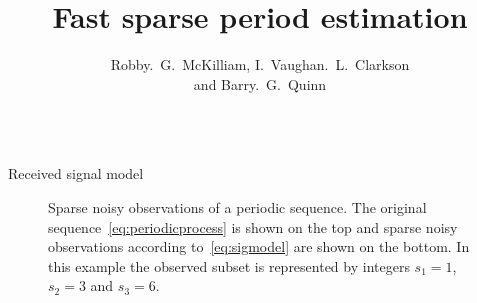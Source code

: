 \documentclass[final,hyperref={pdfpagelabels=false}]{beamer}
\title[]{Fast sparse period estimation}
\author{Robby.~G.~McKilliam, I.~Vaughan.~L.~Clarkson \\ and Barry.~G.~Quinn}
\begin{document}


\begin{columns}[t] %
\begin{column}{.49\textwidth} %

\newcommand{\calC}{{\mathcal C}}
\begin{block}{Received signal model}

{
\def\vertgap{2}
\def\ph{0.4}
\def\T{1.1}
\newcommand{\raxis}{\draw[->] (-0.25,0) -- (8,0) node[above] {$\reals$}; \draw (0,-0.06)-- node[below] {$0$} (0,0.06) }
\newcommand{\pulse}[1]{ \draw[->,>=latex] (#1,0) -- (#1,1) }
\newcommand{\pulsewithnode}[2]{ \draw[->,>=latex] (#1,0) -- node[right] {#2} (#1,1) }
\begin{figure}[t]
	\centering
{} 
		\caption{Sparse noisy observations of a periodic sequence.  The original sequence~\eqref{eq:periodicprocess} is shown on the top and sparse noisy observations according to~\eqref{eq:sigmodel} are shown on the bottom.  In this example the observed subset is represented by integers $s_1=1$, $s_2=3$ and $s_3=6$.}
		\label{fig_stat_model}
\end{figure}
}


\end{block}  


\end{column}
\end{columns}
\end{document}
